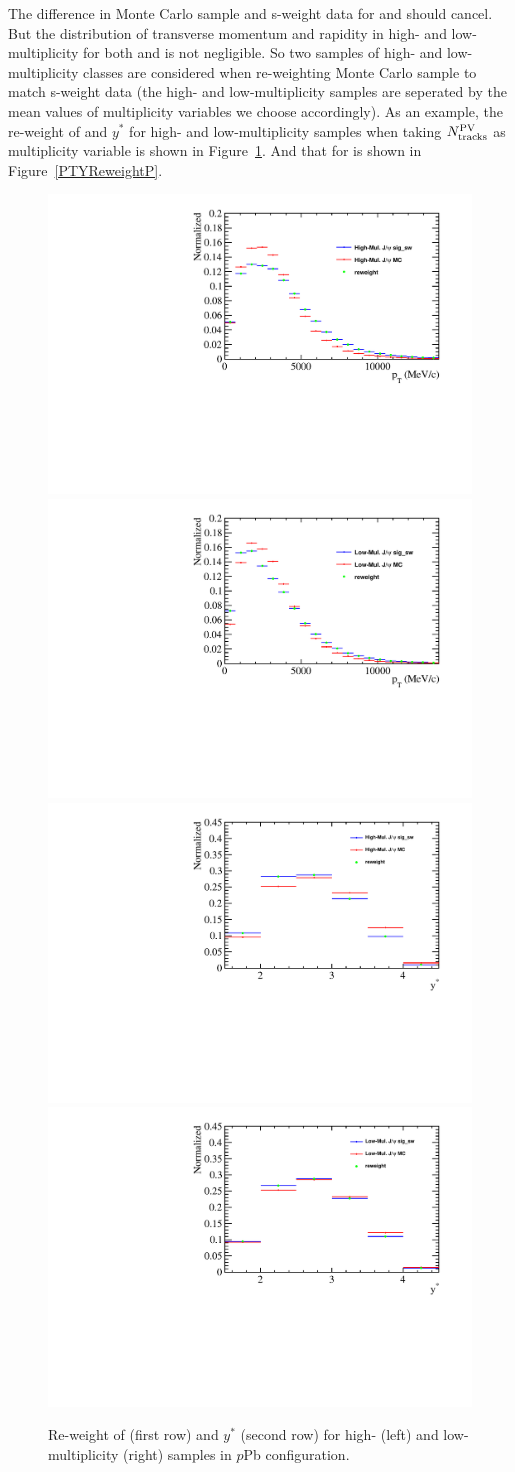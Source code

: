 The difference in Monte Carlo sample and s-weight data for \jpsi and \psitwos should cancel. But the distribution of transverse momentum and rapidity in high- and low- multiplicity for both \jpsi and \psitwos is not negligible. So two samples of high- and low-multiplicity classes are considered when re-weighting Monte Carlo sample to match s-weight data (the high- and low-multiplicity samples are seperated by the mean values of multiplicity variables we choose accordingly). As an example, the re-weight of \pt and $y^*$ for high- and low-multiplicity \jpsi samples when taking $N_{\rm tracks}^{\rm PV}$ as multiplicity variable is shown in Figure~\ref{PTYReweightJ}. And that for \psitwos is shown in Figure~\ref{PTYReweightP}.
\begin{figure}[H]
\begin{center}
\includegraphics[width=0.37\linewidth]{pdf/pPb/Workdir/Reweight/JpsiHighMulPT.pdf}
\includegraphics[width=0.37\linewidth]{pdf/pPb/Workdir/Reweight/JpsiLowMulPT.pdf}
\includegraphics[width=0.37\linewidth]{pdf/pPb/Workdir/Reweight/JpsiHighMulY.pdf}
\includegraphics[width=0.37\linewidth]{pdf/pPb/Workdir/Reweight/JpsiLowMulY.pdf}
\end{center}
\caption{
        Re-weight of \pt (first row) and $y^*$ (second row) for high- (left) and low-multiplicity (right) \jpsi samples in $p$Pb configuration.}
\label{PTYReweightJ}
\end{figure}


